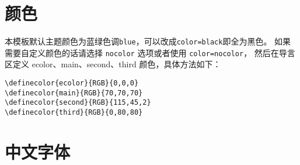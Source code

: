 \documentclass[lang=cn,10pt,cnfont=NotoCJK]{../simplebook}
\begin{document}
\section{颜色}

本模板默认主题颜色为蓝绿色调\lstinline{blue}，可以改成\lstinline{color=black}即全为黑色。
如果需要自定义颜色的话请选择 \lstinline{nocolor} 选项或者使用 \lstinline{color=nocolor}，
然后在导言区定义 ecolor、main、second、third 颜色，具体方法如下：
\begin{lstlisting}[tabsize=4]
\definecolor{ecolor}{RGB}{0,0,0}
\definecolor{main}{RGB}{70,70,70}
\definecolor{second}{RGB}{115,45,2}
\definecolor{third}{RGB}{0,80,80}
\end{lstlisting}


\section{中文字体}
\end{document}
